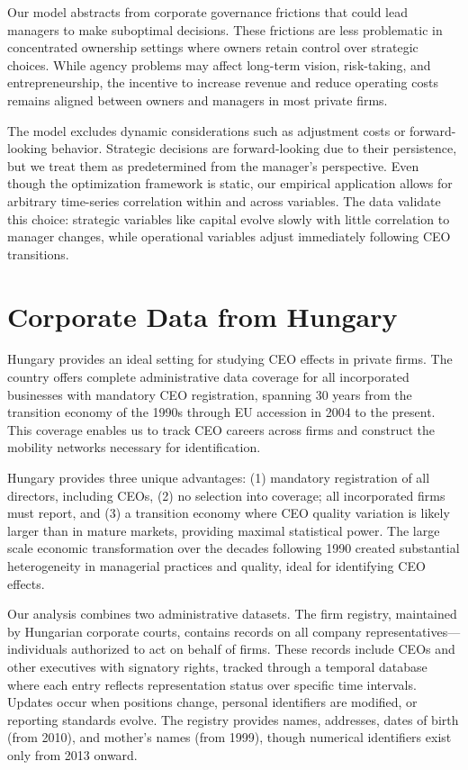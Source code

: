 \documentclass[11pt,a4paper]{article}
\begin{document}
Our model abstracts from corporate governance frictions that could lead managers to make suboptimal decisions. These frictions are less problematic in concentrated ownership settings where owners retain control over strategic choices. While agency problems may affect long-term vision, risk-taking, and entrepreneurship, the incentive to increase revenue and reduce operating costs remains aligned between owners and managers in most private firms.

The model excludes dynamic considerations such as adjustment costs or forward-looking behavior. Strategic decisions are forward-looking due to their persistence, but we treat them as predetermined from the manager's perspective. Even though the optimization framework is static, our empirical application allows for arbitrary time-series correlation within and across variables. The data validate this choice: strategic variables like capital evolve slowly with little correlation to manager changes, while operational variables adjust immediately following CEO transitions.

\section{Corporate Data from Hungary}

Hungary provides an ideal setting for studying CEO effects in private firms. The country offers complete administrative data coverage for all incorporated businesses with mandatory CEO registration, spanning 30 years from the transition economy of the 1990s through EU accession in 2004 to the present. This coverage enables us to track CEO careers across firms and construct the mobility networks necessary for identification.

Hungary provides three unique advantages: (1) mandatory registration of all directors, including CEOs, (2) no selection into coverage; all incorporated firms must report, and (3) a transition economy where CEO quality variation is likely larger than in mature markets, providing maximal statistical power. The large scale economic transformation over the decades following 1990 created substantial heterogeneity in managerial practices and quality, ideal for identifying CEO effects. 

Our analysis combines two administrative datasets. The firm registry, maintained by Hungarian corporate courts, contains records on all company representatives—individuals authorized to act on behalf of firms. These records include CEOs and other executives with signatory rights, tracked through a temporal database where each entry reflects representation status over specific time intervals. Updates occur when positions change, personal identifiers are modified, or reporting standards evolve. The registry provides names, addresses, dates of birth (from 2010), and mother's names (from 1999), though numerical identifiers exist only from 2013 onward.
\end{document}
